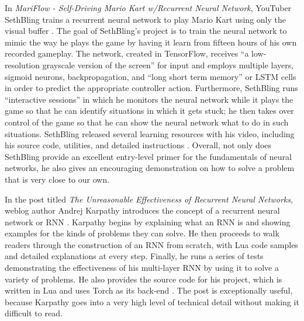 In {\it MariFlow - Self-Driving Mario Kart w/Recurrent Neural Network}, YouTuber SethBling trains a recurrent neural network to play Mario Kart using only the visual buffer \cite{SethBling:2017}. The goal of SethBling's project is to train the neural network to mimic the way he plays the game by having it learn from fifteen hours of his own recorded gameplay. The network, created in TensorFlow, receives ``a low-resolution grayscale version of the screen'' for input and employs multiple layers, sigmoid neurons, backpropagation, and ``long short term memory'' or LSTM cells in order to predict the appropriate controller action. Furthermore, SethBling runs ``interactive sessions'' in which he monitors the neural network while it plays the game so that he can identify situations in which it gets stuck; he then takes over control of the game so that he can show the neural network what to do in such situations. SethBling released several learning resources with his video, including his source code, utilities, and detailed instructions \cite{SethBling:2017}. Overall, not only does SethBling provide an excellent entry-level primer for the fundamentals of neural networks, he also gives an encouraging demonstration on how to solve a problem that is very close to our own.

In the post titled {\it The Unreasonable Effectiveness of Recurrent Neural Networks}, weblog author Andrej Karpathy introduces the concept of a recurrent neural network or RNN \cite{Karpathy:2015}. Karpathy begins by explaining what an RNN is and showing examples for the kinds of problems they can solve. He then proceeds to walk readers through the construction of an RNN from scratch, with Lua code samples and detailed explanations at every step. Finally, he runs a series of tests demonstrating the effectiveness of his multi-layer RNN by using it to solve a variety of problems. He also provides the source code for his project, which is written in Lua and uses Torch as its back-end \cite{Karpathy:2015}. The post is exceptionally useful, because Karpathy goes into a very high level of technical detail without making it difficult to read.

